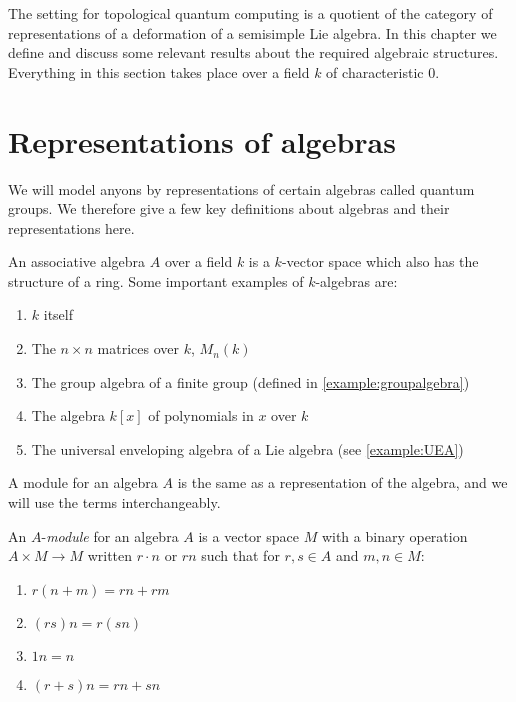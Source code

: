 The setting for topological quantum computing is a quotient of the category of
representations of a deformation of a semisimple Lie algebra. In this chapter
we define and discuss some relevant results about the required algebraic
structures. Everything in this section takes place over a field $k$ of
characteristic 0.

\section{Representations of algebras}

We will model anyons by representations of certain algebras called quantum
groups. We therefore give a few key definitions about algebras and their
representations here.  

An associative algebra $A$ over a field $k$ is a $k$-vector space which also
has the structure of a ring. Some important examples of $k$-algebras are: 

\begin{enumerate}
    \item $k$ itself
    \item The $n \times n$ matrices over $k$, $M_n(k)$
    \item The group algebra of a finite group (defined in \ref{example:groupalgebra})
    \item The algebra $k[x]$ of polynomials in $x$ over $k$
    \item The universal enveloping algebra of a Lie algebra (see \ref{example:UEA})
\end{enumerate}

A module for an algebra $A$ is the same as a representation of the algebra, and
we will use the terms interchangeably. 

\begin{defn}
    An $A$-\emph{module} for an algebra $A$ is a vector space $M$ with a binary
    operation $A \times M \to M$ written $r\cdot n$ or $rn$ such that for $r,s
    \in A$ and $m,n \in M$:

    \begin{enumerate}
        \item $r(n + m) = rn + rm$
        \item $(rs)n = r(sn)$
        \item $1n = n$
        \item $(r+s)n = rn + sn$
    \end{enumerate}
\end{defn}

